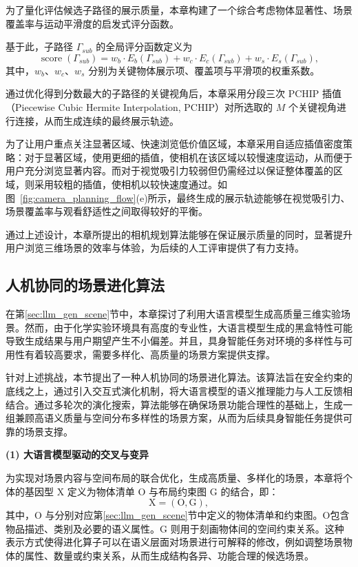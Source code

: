 为了量化评估候选子路径的展示质量，本章构建了一个综合考虑物体显著性、场景覆盖率与运动平滑度的启发式评分函数。

基于此，子路径 $\Gamma_{sub}$ 的全局评分函数定义为
\begin{equation}
\operatorname{score}(\Gamma_{sub})=w_b \cdot E_b(\Gamma_{sub})+w_c \cdot E_c(\Gamma_{sub})+w_s \cdot E_s(\Gamma_{sub}),
\end{equation}
其中，$w_b$、$w_c$、$w_s$ 分别为关键物体展示项、覆盖项与平滑项的权重系数。

通过优化得到分数最大的子路径的关键视角后，本章采用分段三次 PCHIP 插值（Piecewise Cubic Hermite Interpolation\cite{fritsch1984method}, PCHIP）对所选取的 $M$ 个关键视角进行连接，从而生成连续的最终展示轨迹。

为了让用户重点关注显著区域、快速浏览低价值区域，本章采用自适应插值密度策略：对于显著区域，使用更细的插值，使相机在该区域以较慢速度运动，从而便于用户充分浏览显著内容。而对于视觉吸引力较弱但仍需经过以保证整体覆盖的区域，则采用较粗的插值，使相机以较快速度通过。如图~\ref{fig:camera_planning_flow}(e)所示，最终生成的展示轨迹能够在视觉吸引力、场景覆盖率与观看舒适性之间取得较好的平衡。

通过上述设计，本章所提出的相机规划算法能够在保证展示质量的同时，显著提升用户浏览三维场景的效率与体验，为后续的人工评审提供了有力支持。


\subsection{人机协同的场景进化算法}
\label{sec:evo_opt}

在第\ref{sec:llm_gen_scene}节中，本章探讨了利用大语言模型生成高质量三维实验场景。然而，由于化学实验环境具有高度的专业性，大语言模型生成的黑盒特性可能导致生成结果与用户期望产生不小偏差。并且，具身智能任务对环境的多样性与可用性有着较高要求，需要多样化、高质量的场景方案提供支撑。

针对上述挑战，本节提出了一种人机协同的场景进化算法。该算法旨在安全约束的底线之上，通过引入交互式演化机制，将大语言模型的语义推理能力与人工反馈相结合。通过多轮次的演化搜索，算法能够在确保场景功能合理性的基础上，生成一组兼顾高语义质量与空间分布多样性的场景方案，从而为后续具身智能任务提供可靠的场景支撑。

\noindent\textbf{(1) 大语言模型驱动的交叉与变异}

为实现对场景内容与空间布局的联合优化，生成高质量、多样化的场景，本章将个体的基因型 $\text{X}$ 定义为物体清单 $\text{O}$ 与布局约束图 $\text{G}$ 的结合，即：
\begin{equation}
\text{X}=(\text{O},\text{G}),
\end{equation}
其中，$\text{O}$ 与分别对应第\ref{sec:llm_gen_scene}节中定义的物体清单和约束图。$\text{O}$包含物品描述、类别及必要的语义属性。$\text{G}$ 则用于刻画物体间的空间约束关系。这种表示方式使得进化算子可以在语义层面对场景进行可解释的修改，例如调整场景物体的属性、数量或约束关系，从而生成结构各异、功能合理的候选场景。

